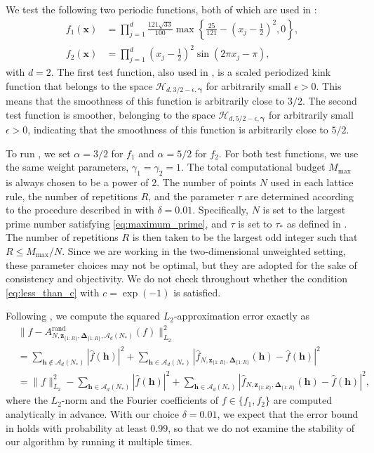 \documentclass[pdflatex,sn-basic,Numbered]{sn-jnl}%
\newcommand{\rand}{\mathrm{rand}}
\newcommand{\bsh}{\boldsymbol{h}}
\newcommand{\bsx}{\boldsymbol{x}}
\newcommand{\bsz}{\boldsymbol{z}}
\newcommand{\bsgamma}{\boldsymbol{\gamma}}
\newcommand{\bsDelta}{\boldsymbol{\Delta}}
\newcommand{\Acal}{\mathcal{A}}
\newcommand{\Hcal}{\mathcal{H}}
\theoremstyle{thmstyleone}%
\theoremstyle{thmstyletwo}%
\begin{document}
We test the following two periodic functions, both of which are used in \cite{CGK24}:
\begin{align*}
f_1(\bsx) &=  \prod_{j=1}^d \frac{121\sqrt{33}}{100}\max \left\{\frac{25}{121}-\left(x_j-\frac{1}{2} \right)^2, 0 \right \}, \\
f_2(\bsx) &= \prod_{j=1}^{d} \left(x_j-\frac{1}{2} \right)^2\sin(2\pi x_j-\pi),
\end{align*}
with $d=2$. The first test function, also used in \cite{kammerer2019approximation}, is a scaled periodized kink function that belongs to the space $\Hcal_{d,3/2-\epsilon,\bsgamma}$ for arbitrarily small $\epsilon > 0$. This means that the smoothness of this function is arbitrarily close to $3/2$. The second test function is smoother, belonging to the space $\Hcal_{d,5/2-\epsilon,\bsgamma}$ for arbitrarily small $\epsilon > 0$, indicating that the smoothness of this function is arbitrarily close to $5/2$.

To run , we set $\alpha = 3/2$ for $f_1$ and $\alpha = 5/2$ for $f_2$. For both test functions, we use the same weight parameters, $\gamma_1 = \gamma_2 = 1$. The total computational budget $M_{\max}$ is always chosen to be a power of 2. The number of points $N$ used in each lattice rule, the number of repetitions $R$, and the parameter $\tau$ are determined according to the procedure described in  with $\delta = 0.01$. Specifically, $N$ is set to the largest prime number satisfying \eqref{eq:maximum_prime}, and $\tau$ is set to $\tau_*$ as defined in . The number of repetitions $R$ is then taken to be the largest odd integer such that $R \leq M_{\max}/N$. Since we are working in the two-dimensional unweighted setting, these parameter choices may not be optimal, but they are adopted for the sake of consistency and objectivity. We do not check throughout whether the condition \eqref{eq:less_than_c} with $c = \exp(-1)$ is satisfied.

Following \cite{CGK24}, we compute the squared $L_2$-approximation error exactly as
\begin{align*}
    &\|f-A^{\rand}_{N,\bsz_{\{1{:}R\}},\bsDelta_{\{1{:}R\}},\Acal_d(N_*)}(f)\|^2_{L_2}\\
    & = \sum_{\bsh\notin \mathcal{A}_d(N_*)} |\widehat{f}(\bsh)|^2+\sum_{\bsh\in \Acal_d(N_*)}|\widehat{f}_{N,\bsz_{\{1{:}R\}},\bsDelta_{\{1{:}R\}}}(\bsh)-\widehat{f}(\bsh)|^2\\
    & = \|f\|_{L_2}^2-\sum_{\bsh\in \mathcal{A}_d(N_*)} |\widehat{f}(\bsh)|^2+\sum_{\bsh\in \Acal_d(N_*)}|\widehat{f}_{N,\bsz_{\{1{:}R\}},\bsDelta_{\{1{:}R\}}}(\bsh)-\widehat{f}(\bsh)|^2,
\end{align*} 
where the $L_2$-norm and the Fourier coefficients of $f \in \{f_1, f_2\}$ are computed analytically in advance. With our choice $\delta = 0.01$, we expect that the error bound in  holds with probability at least $0.99$, so that we do not examine the stability of our algorithm by running it multiple times.
\end{document}
